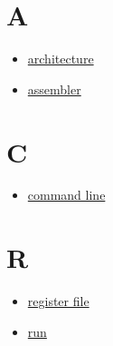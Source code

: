 \documentclass[11pt]{article}
\date{\today}
\title{}
\begin{document}
\section{A}
\label{sec:orgc61ad33}
\begin{itemize}
\item \href{Sigma16UserGuide.org}{architecture}
\item \href{Sigma16UserGuide.org}{assembler}
\end{itemize}
\section{C}
\label{sec:org478ea6d}
\begin{itemize}
\item \href{Sigma16UserGuide.org}{command line}
\end{itemize}
\section{R}
\label{sec:orgb395ed0}
\begin{itemize}
\item \href{Sigma16UserGuide.org}{register file}
\item \href{Sigma16UserGuide.org}{run}
\end{itemize}
\end{document}
